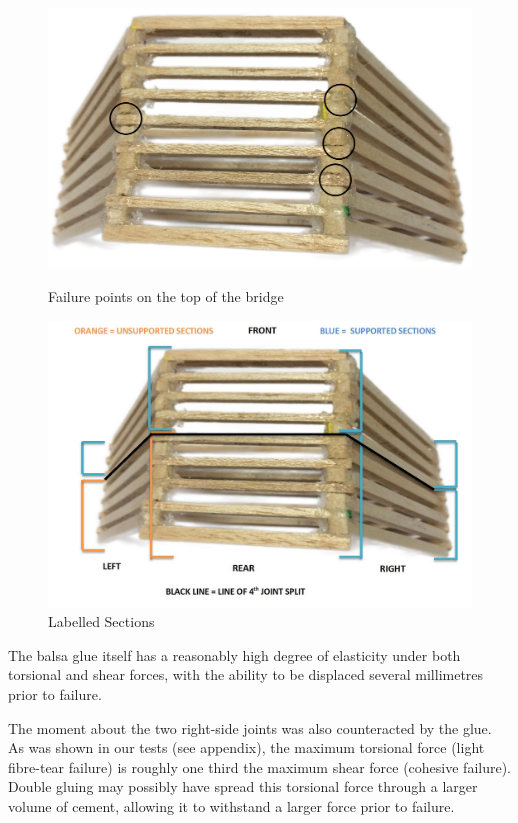 \documentclass[12pt]{article}
\begin{document}
		 
		   \begin{figure}[h!]
                 	\centering
			\begin{minipage}[b]{0.45\linewidth}
			\includegraphics[width=1.1\textwidth]{failtop}
			\caption{Failure points on the top of the bridge}
			\label{failtop}
		\end{minipage}
		\quad
	\begin{minipage}[b]{0.45\linewidth}
			\includegraphics[width=1.4\textwidth]{AnalysisLabelled}
			\caption{Labelled Sections}
			\label{AnalysisLabelled}
		\end{minipage}
		\end{figure}
             
The balsa glue itself has a reasonably high degree of elasticity under both torsional and shear forces, with the ability to be displaced several millimetres prior to failure. 

The moment about the two right-side joints was also counteracted by the glue. As was shown in our tests (see appendix), the maximum torsional force (light fibre-tear failure) is roughly one third the maximum shear force (cohesive failure). Double gluing may possibly have spread this torsional force through a larger volume of cement, allowing it to withstand a larger force prior to failure. 
\end{document}

